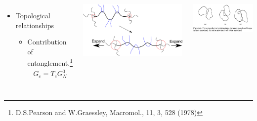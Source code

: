 \documentclass[12pt, dvipdfmx]{beamer}
\begin{document}
\begin{frame}
\begin{columns}[totalwidth=1\textwidth]
\begin{itemize}
					\item Topological relationships
					\begin{itemize}
						\item Contribution of entanglement.\footnote{\tiny{D.S.Pearson and W.Graessley, Macromol., 11, 3, 528 (1978)}}
						\vspace{-2mm}
						\scriptsize
						\begin{align*}
							G_e = T_e G_N^0
						\end{align*}
					\end{itemize}
				\end{itemize}
				\vspace{-2mm}
				\includegraphics[width=\textwidth]{Constrained_Juntion.pdf}

				\vspace{3mm}
				\includegraphics[width=\textwidth]{topological_effect_ring.png}
			\end{columns}
\end{frame}

\setcounter{footnote}{0}
\end{document}
